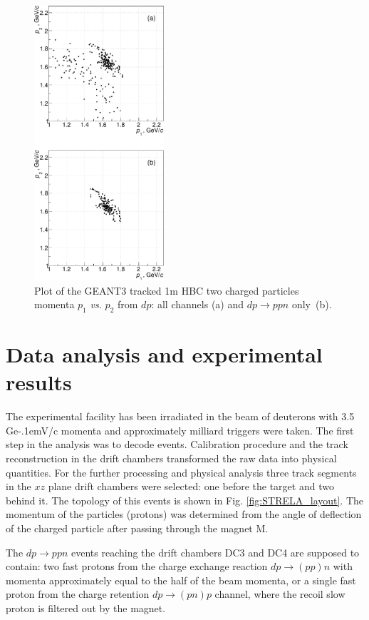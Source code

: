 \documentclass[twocolumn,epjc3]{svjour3}
\newcommand{\dpfrag} {\ensuremath{dp \rightarrow ppn}\xspace}
\newcommand{\dpchex} {\ensuremath{dp \rightarrow (pp)n}\xspace}
\newcommand{\dpret}  {\ensuremath{dp \rightarrow (pn)p}\xspace}
\newcommand{\GeVc}   {Ge\kern-.1emV/c\xspace}
\begin{document}
\begin{figure}[t]
  \centering
  \includegraphics[width=0.43\textwidth]{p1_vs_p2_1.pdf}
  \caption{Plot of the GEANT3 tracked 1m HBC two charged particles momenta $p_1$
    \textit{vs.} $p_2$ from $dp$: all channels (a) and \dpfrag only~(b).}
  \label{fig:p1vsp2_sim}
\end{figure}

\section{Data analysis and experimental results}
The experimental facility has been irradiated in the beam of deuterons with 3.5
\GeVc momenta and approximately milliard triggers were taken. The first step in
the analysis was to decode events. Calibration procedure and the track
reconstruction in the drift chambers transformed the raw data into physical
quantities. For the further processing and physical analysis three track
segments in the $xz$ plane drift chambers were selected: one before the target
and two behind it. The topology of this events is shown in
Fig. \ref{fig:STRELA_layout}. The momentum of the particles (protons) was
determined from the angle of deflection of the charged particle after passing
through the magnet M.

The \dpfrag events reaching the drift chambers DC3 and DC4 are supposed to
contain: two fast protons from the charge exchange reaction \dpchex with momenta
approximately equal to the half of the beam momenta, or a single fast proton
from the charge retention \dpret channel, where the recoil slow proton is
filtered out by the magnet.
\end{document}
